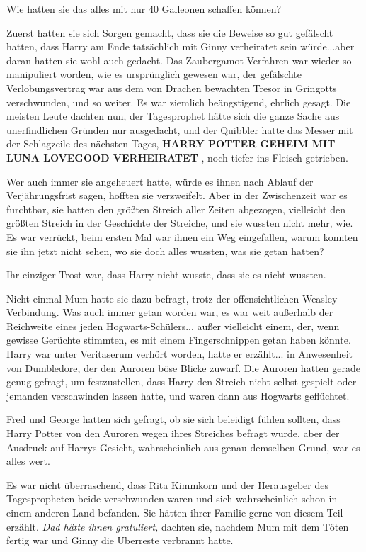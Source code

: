 Wie hatten sie das alles mit nur 40 Galleonen schaffen können?

Zuerst hatten sie sich Sorgen gemacht, dass sie die Beweise so gut gefälscht
hatten, dass Harry am Ende tatsächlich mit Ginny verheiratet sein würde...aber
daran hatten sie wohl auch gedacht. Das Zaubergamot-Verfahren war wieder so
manipuliert worden, wie es ursprünglich gewesen war, der gefälschte
Verlobungsvertrag war aus dem von Drachen bewachten Tresor in Gringotts
verschwunden, und so weiter. Es war ziemlich beängstigend, ehrlich gesagt. Die
meisten Leute dachten nun, der Tagesprophet hätte sich die ganze Sache aus
unerfindlichen Gründen nur ausgedacht, und der Quibbler hatte das Messer mit der
Schlagzeile des nächsten Tages, \textbf{HARRY POTTER GEHEIM MIT LUNA LOVEGOOD
VERHEIRATET} , noch tiefer ins Fleisch getrieben.

Wer auch immer sie angeheuert hatte, würde es ihnen nach Ablauf der
Verjährungsfrist sagen, hofften sie verzweifelt. Aber in der Zwischenzeit war es
furchtbar, sie hatten den größten Streich aller Zeiten abgezogen, vielleicht den
größten Streich in der Geschichte der Streiche, und sie wussten nicht mehr, wie.
Es war verrückt, beim ersten Mal war ihnen ein Weg eingefallen, warum konnten
sie ihn jetzt nicht sehen, wo sie doch alles wussten, was sie getan hatten?

Ihr einziger Trost war, dass Harry nicht wusste, dass sie es nicht wussten.

Nicht einmal Mum hatte sie dazu befragt, trotz der offensichtlichen
Weasley-Verbindung. Was auch immer getan worden war, es war weit außerhalb der
Reichweite eines jeden Hogwarts-Schülers... außer vielleicht einem, der, wenn
gewisse Gerüchte stimmten, es mit einem Fingerschnippen getan haben könnte.
Harry war unter Veritaserum verhört worden, hatte er erzählt... in Anwesenheit
von Dumbledore, der den Auroren böse Blicke zuwarf. Die Auroren hatten gerade
genug gefragt, um festzustellen, dass Harry den Streich nicht selbst gespielt
oder jemanden verschwinden lassen hatte, und waren dann aus Hogwarts geflüchtet.

Fred und George hatten sich gefragt, ob sie sich beleidigt fühlen sollten, dass
Harry Potter von den Auroren wegen ihres Streiches befragt wurde, aber der
Ausdruck auf Harrys Gesicht, wahrscheinlich aus genau demselben Grund, war es
alles wert.

Es war nicht überraschend, dass Rita Kimmkorn und der Herausgeber des
Tagespropheten beide verschwunden waren und sich wahrscheinlich schon in einem
anderen Land befanden. Sie hätten ihrer Familie gerne von diesem Teil erzählt.
\emph{Dad hätte ihnen gratuliert,} dachten sie, nachdem Mum mit dem Töten fertig
war und Ginny die Überreste verbrannt hatte.

